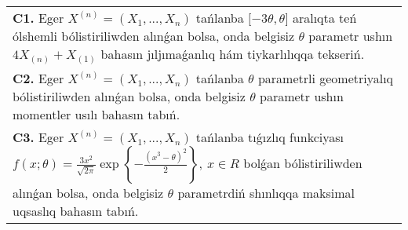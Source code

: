 \documentclass{article}
\begin{document}
\begin{tabular}{m{17cm}}
\textbf{C1.} 
Eger \(X^{(n)} = \left( X_{1},...,X_{n} \right)\) tańlanba \(\lbrack - 3\theta,\theta\rbrack\) aralıqta teń ólshemli bólistiriliwden alınǵan bolsa, onda belgisiz \(\theta\) parametr ushın \(4X_{(n)} + X_{(1)}\) bahasın jıljımaǵanlıq hám tiykarlılıqqa tekseriń.
 \\
\textbf{C2.} 
Eger \(X^{(n)} = \left( X_{1},...,X_{n} \right)\) tańlanba \(\theta\) parametrli geometriyalıq bólistiriliwden alınǵan bolsa, onda belgisiz \(\theta\) parametr ushın momentler usılı bahasın tabıń.
 \\
\textbf{C3.} 
Eger \(X^{(n)} = \left( X_{1},...,X_{n} \right)\) tańlanba tıǵızlıq funkciyası
$f(x;\theta) = \frac{3x^{2}}{\sqrt{2\pi}}\exp\left\{ - \frac{\left( x^{3} - \theta \right)^{2}}{2} \right\},\ x \in R$
bolǵan bólistiriliwden alınǵan bolsa, onda belgisiz \(\theta\) parametrdiń shınlıqqa maksimal uqsaslıq bahasın tabıń.
 \\

\end{tabular}
\vspace{1cm}
\end{document}
